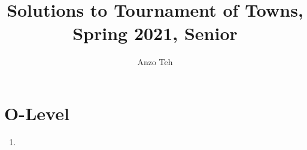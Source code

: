 \documentclass[11pt,a4paper]{article}
\begin{document}
\newcommand{\la}{\leftarrow}
\newcommand{\lra}{\leftrightarrow}
\newcommand{\bbN}{\mathbb{N}}
\newcommand{\bbZ}{\mathbb{Z}}
\newcommand{\dsum}{\displaystyle\sum}
\newcommand{\dprod}{\displaystyle\prod}


\title{Solutions to Tournament of Towns, Spring 2021, Senior}
\author{Anzo Teh}
\date{}
\maketitle

\section*{O-Level}
\begin{enumerate}
	\item
\end{enumerate}
\end{document}
